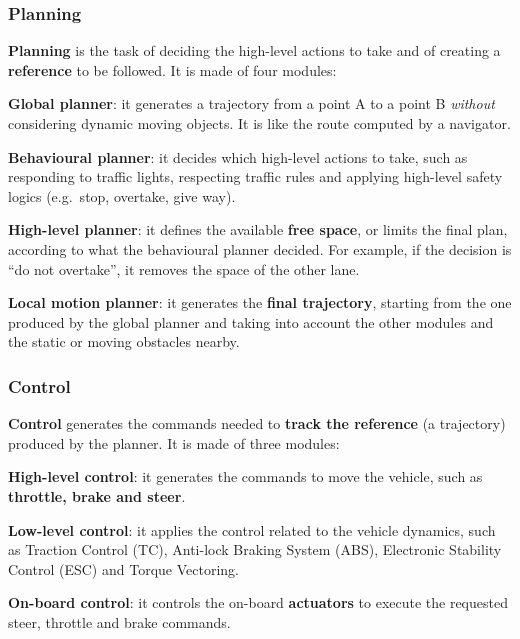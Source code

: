 \subsubsection{Planning}
\textbf{Planning} is the task of deciding the high-level actions to take and of creating a \textbf{reference} to be followed. It is made of four modules:
\begin{compactitemize}
    \item \textbf{Global planner}: it generates a trajectory from a point A to a point B \emph{without} considering dynamic moving objects. It is like the route computed by a navigator.
    \item \textbf{Behavioural planner}: it decides which high-level actions to take, such as responding to traffic lights, respecting traffic rules and applying high-level safety logics (e.g.\ stop, overtake, give way).
    \item \textbf{High-level planner}: it defines the available \textbf{free space}, or limits the final plan, according to what the behavioural planner decided. For example, if the decision is ``do not overtake'', it removes the space of the other lane.
    \item \textbf{Local motion planner}: it generates the \textbf{final trajectory}, starting from the one produced by the global planner and taking into account the other modules and the static or moving obstacles nearby.
\end{compactitemize}

\subsubsection{Control}
\textbf{Control} generates the commands needed to \textbf{track the reference} (a trajectory) produced by the planner. It is made of three modules:
\begin{compactitemize}
    \item \textbf{High-level control}: it generates the commands to move the vehicle, such as \textbf{throttle, brake and steer}.
    \item \textbf{Low-level control}: it applies the control related to the vehicle dynamics, such as Traction Control (TC), Anti-lock Braking System (ABS), Electronic Stability Control (ESC) and Torque Vectoring.
    \item \textbf{On-board control}: it controls the on-board \textbf{actuators} to execute the requested steer, throttle and brake commands.
\end{compactitemize}

